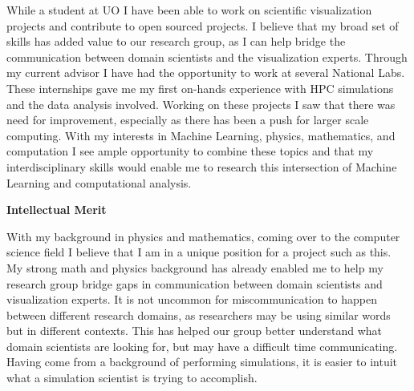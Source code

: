 \documentclass[12pt]{article}
\begin{document}
While a student at UO I have been able to work on scientific visualization
projects and contribute to open sourced projects. I believe that my broad set of
skills has added value to our research group, as I can help bridge the
communication between domain scientists and the visualization experts. Through
my current advisor I have had the opportunity to work at several National Labs.
These internships gave me my first on-hands experience with HPC simulations and
the data analysis involved. Working on these projects I saw that there was need
for improvement, especially as there has been a push for larger scale computing.
With my interests in Machine Learning, physics, mathematics, and computation I
see ample opportunity to combine these topics and that my interdisciplinary
skills would enable me to research this intersection of Machine Learning and
computational analysis.

\textbf{Intellectual Merit}
%

With my background in physics and mathematics, coming over to the computer
science field I believe that I am in a unique position for a project such as
this. My strong math and physics background has already enabled me to help my
research group bridge gaps in communication between domain scientists and
visualization experts. It is not uncommon for miscommunication to happen between
different research domains, as researchers may be using similar words but in
different contexts. This has helped our group better understand what domain
scientists are looking for, but may have a difficult time communicating. Having
come from a background of performing simulations, it is easier to intuit what a
simulation scientist is trying to accomplish.
\end{document}
